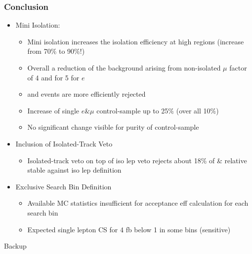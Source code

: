\documentclass{beamer}
\begin{document}
\begin{frame}
 \frametitle{Conclusion}
 \begin{itemize}
  \item Mini Isolation:
 \begin{itemize}
  \item Mini isolation increases the isolation efficiency at high \HT regions (increase from 70\% to 90\%!)
  \item Overall a reduction of the background arising from non-isolated $\mu$ factor of 4 and for 5  for $e$
  \item \wpj and \ttbar events are more efficiently rejected
  \item Increase of single $e \& \mu$ control-sample up to 25\% (over all 10\%)
  \item No significant change visible for purity of control-sample
  \end{itemize}
  \item Inclusion of Isolated-Track Veto
  \begin{itemize}
   \item Isolated-track veto on top of iso lep veto rejects about 18\% of \ttbar \& \wpj relative stable against iso lep definition
  \end{itemize}
    \item Exclusive Search Bin Definition
  \begin{itemize}
   \item Available MC statistics insufficient for acceptance eff calculation for each search bin
   \item Expected single lepton CS for 4 fb below 1 in some bins (sensitive)
  \end{itemize}

 \end{itemize}

\end{frame}

\begin{frame}
 \begin{block}{}
 \centering
 \Large Backup
 \end{block}
\end{frame}
\end{document}
